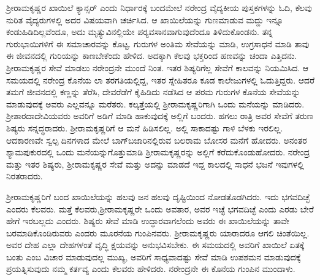ಶ‍್ರೀರಾಮಕೃಷ್ಣರ ಖಾಯಿಲೆ ಕ್ಯಾನ್ಸರ್ ಎಂದು ನಿರ್ಧಾರಕ್ಕೆ ಬಂದಮೇಲೆ ನರೇಂದ್ರ ವೈದ್ಯಕೀಯ ಪುಸ್ತಕಗಳನ್ನು ಓದಿ, ಕೆಲವು ನುರಿತ ವೈದ್ಯರುಗಳಲ್ಲಿ ಅದರ ವಿಷಯವಾಗಿ ಚರ್ಚಿಸಿದ. ಆ ಖಾಯಿಲೆಯನ್ನು ಗುಣಮಾಡುವ ಮದ್ದು ಇನ್ನೂ ಕಂಡುಹಿಡಿದಿಲ್ಲವೆಂದೂ, ಅದು ಮೃತ್ಯುವಿನಲ್ಲಿಯೇ ಪರ‍್ಯವಸಾನವಾಗುವುದೆಂದೂ ತಿಳಿದುಕೊಂಡನು. ತನ್ನ ಗುರುಭಾಯಿಗಳಿಗೆ ಈ ಸಮಾಚಾರವನ್ನು ಕೊಟ್ಟ. ಗುರುಗಳ ಅಂತಿಮ ಸೇವೆಯನ್ನು ಮಾಡಿ, ಉಗ್ರಸಾಧನೆ ಮಾಡಿ ತಾವು ಈ ಜೀವನದಲ್ಲಿ ಗುರಿಯನ್ನು ಕಾಣಬೇಕೆಂದು ಹೇಳಿದ. ಅದಕ್ಕಾಗಿ ಕೆಲವು ಭಕ್ತರಿಂದ ಹಣವನ್ನು ಚಂದಾ ಎತ್ತಿದನು. ಶ‍್ರೀರಾಮಕೃಷ್ಣರ ಸೇವೆ ಮಾಡಲು ನರೇಂದ್ರನೇ ಮುಂದೆ ನಿಂತ. ಇತರ ಶಿಷ್ಯರಿಗೆಲ್ಲ ಸೇವೆಗೆ ಕಾಲವನ್ನು ನಿಯಮಿಸಿದ. ಆ ಸಮಯದಲ್ಲಿ ನರೇಂದ್ರ ಕೊನೆಯ ಲಾ ತರಗತಿಯಲ್ಲಿದ್ದ, ಇತರ ಸ್ನೇಹಿತರೂ ಕೂಡ ಕಾಲೇಜುಗಳಲ್ಲಿ ಓದುತ್ತಿದ್ದರು. ಆದರೆ ತಮಗೆ ಜೀವನದಲ್ಲಿ ಕಣ್ಣನ್ನು ತೆರೆಸಿ, ದೇವರೆಡೆಗೆ ಕೈಹಿಡಿದು ನಡೆಸಿದ ಆ ಪರಮ ಗುರುಗಳ ಕೊನೆಯ ಸೇವೆಯನ್ನು ಮಾಡುವುದಕ್ಕೆ ಅವರು ಎಲ್ಲವನ್ನೂ ಮರೆತರು. ಕಲ್ಕತ್ತೆಯಲ್ಲಿ ಶ‍್ರೀರಾಮಕೃಷ್ಣರಿಗಾಗಿ ಒಂದು ಮನೆಯನ್ನು ಮಾಡಿದರು. ಶ‍್ರೀಶಾರದಾದೇವಿಯವರು ಅವರಿಗೆ ಅಡಿಗೆ ಮಾಡಿ ಹಾಕುವುದಕ್ಕೆ ಅಲ್ಲಿಗೆ ಬಂದರು. ಹಗಲು ರಾತ್ರಿ ಅವರ ಸೇವೆಗೆ ತರುಣ ಶಿಷ್ಯರು ಸನ್ನದ್ಧರಾದರು. ಶ‍್ರೀರಾಮಕೃಷ್ಣರಿಗೆ ಆ ಮನೆ ಹಿಡಿಸಲಿಲ್ಲ. ಅಲ್ಲಿ ಸಾಕಾದಷ್ಟು ಗಾಳಿ ಬೆಳಕು ಇರಲಿಲ್ಲ. ಆದಕಾರಣವೇ ಸ್ವಲ್ಪ ದಿನಗಳಾದ ಮೇಲೆ ಬಾಗ್‍ಬಜಾರಿನಲ್ಲಿರುವ ಬಲರಾಮ ಬೋಸರ ಮನೆಗೆ ಹೋದರು. ಅನಂತರ ಶ್ಯಾಮಪುಕುರದಲ್ಲಿ ಒಂದು ಮನೆಯನ್ನು\break ಗೊತ್ತುಮಾಡಿ ಶ‍್ರೀರಾಮಕೃಷ್ಣರನ್ನು ಅಲ್ಲಿಗೆ ಕರೆದುಕೊಂಡುಹೋದರು. ನರೇಂದ್ರ ಮತ್ತು ಇತರ ಶಿಷ್ಯರು, ಶ‍್ರೀರಾಮಕೃಷ್ಣರ ಸೇವೆ ಮತ್ತು ಅದನ್ನು ಮಾಡದೆ ಇದ್ದ ಕಾಲದಲ್ಲಿ ಸಾಧನೆ ಭಜನೆ ಇವುಗಳಲ್ಲಿ ನಿರತರಾದರು.

ಶ‍್ರೀರಾಮಕೃಷ್ಣರಿಗೆ ಬಂದ ಖಾಯಿಲೆಯನ್ನು ಹಲವು ಜನ ಹಲವು ದೃಷ್ಟಿಯಿಂದ ನೋಡತೊಡಗಿದರು. ಇದು ಭಗವದಿಚ್ಛೆ ಎಂದರು ಕೆಲವರು. ಮತ್ತೆ ಕೆಲವರು,\break ಶ‍್ರೀರಾಮಕೃಷ್ಣರೇ ಒಂದು ಅವತಾರ, ಅವರ ಇಚ್ಛೆ ಭಗವದಿಚ್ಛೆ ಎಂದು ಎರಡು ಬೇರೆ ಹೇಗೆ ಇರಬಲ್ಲದು ಎಂದರು. ಶಿಷ್ಯರು ಸೇವೆ ಮಾಡಿ ಉದ್ಧಾರವಾಗಲೆಂದು ಅವರು ಈ ಖಾಯಿಲೆಯನ್ನು ತಾವೇ ಬರಮಾಡಿಕೊಂಡಿರುವರು ಎಂದರು ಮೂರನೆಯ ಗುಂಪಿನವರು. ಶ‍್ರೀರಾಮಕೃಷ್ಣರು ಯಾರಾದರೂ ಆಗಲಿ ಚಿಂತೆಯಿಲ್ಲ. ಅವರ ದೇಹ ಎಲ್ಲಾ ದೇಹಗಳಂತೆ ವೃದ್ಧಿ ಕ್ಷಯವನ್ನು ಅನುಭವಿಸಬೇಕು. ಈ ಸಮಯದಲ್ಲಿ ಅವರಿಗೆ ಖಾಯಿಲೆ ಏತಕ್ಕೆ ಬಂತು ಎಂಬ ವಿಚಾರ ಮಾಡುವುದಲ್ಲ ಮುಖ್ಯ, ಅವರಿಗೆ ಸಾಧ್ಯವಾದಷ್ಟು ಸೇವೆ ಮಾಡಿ ಉಪಶಮನ ಮಾಡುವುದಕ್ಕೆ ಪ್ರಯತ್ನಿಸುವುದು ನಮ್ಮ ಕರ್ತವ್ಯ ಎಂದು ಕೆಲವರು ಹೇಳಿದರು. ನರೇಂದ್ರನೇ ಈ ಕೊನೆಯ ಗುಂಪಿನ ಮುಂದಾಳು.


